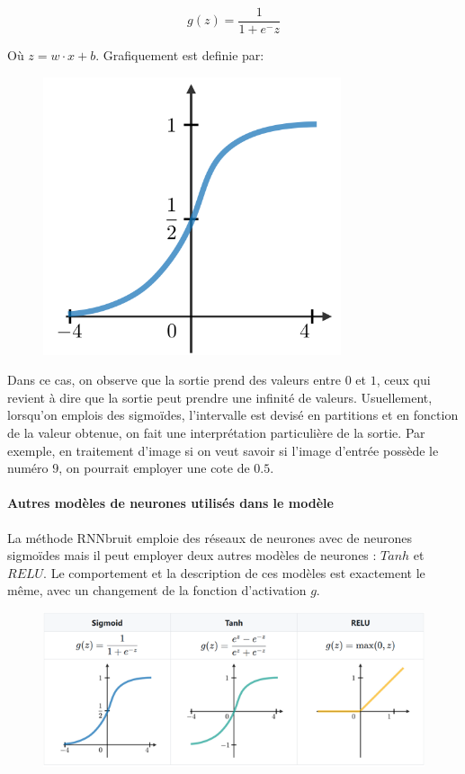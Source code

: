 \documentclass[conference,onecolumn]{IEEEtran}
\begin{document}
\begin{equation}
    g(z)=\dfrac{1}{1+e^-z}
\end{equation}

Où $z=w\cdot x+b$. Grafiquement est definie par:

 \begin{figure}[H]
 \centering
    \includegraphics[scale=0.5]{img10.png}
\end{figure}

Dans ce cas, on observe que la sortie prend des valeurs entre $0$ et $1$, ceux qui revient à dire que la sortie peut prendre une infinité de valeurs. Usuellement, lorsqu’on emplois des sigmoïdes, l’intervalle est devisé en partitions et en fonction de la valeur obtenue, on fait une interprétation particulière de la sortie. Par exemple, en traitement d’image si on veut savoir si l’image d’entrée possède le numéro $9$, on pourrait employer une cote de $0.5$.  


\paragraph{Autres modèles de neurones utilisés dans le modèle}
La méthode RNNbruit emploie des réseaux de neurones avec de neurones sigmoïdes mais il peut employer deux autres modèles de neurones : $Tanh$ et $RELU$. Le comportement et la description de ces modèles est exactement le même, avec un changement de la fonction d’activation $g$. 

 \begin{figure}[H]
 \centering
    \includegraphics[scale=0.7]{img11.png}
\end{figure}
\end{document}
